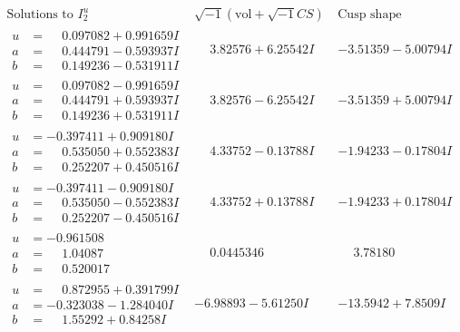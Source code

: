 \documentclass[1p]{elsarticle_modified}
\theoremstyle{definition}
\newcommand{\I}{\sqrt{-1}}
\begin{document}
$$\begin{array}{c|c|c}  
\text{Solutions to }I^u_{2}& \I (\text{vol} + \sqrt{-1}CS) & \text{Cusp shape}\\
 \hline 
\begin{aligned}
u &= \phantom{-}0.097082 + 0.991659 I \\
a &= \phantom{-}0.444791 - 0.593937 I \\
b &= \phantom{-}0.149236 - 0.531911 I\end{aligned}
 & \phantom{-}3.82576 + 6.25542 I & -3.51359 - 5.00794 I \\ \hline\begin{aligned}
u &= \phantom{-}0.097082 - 0.991659 I \\
a &= \phantom{-}0.444791 + 0.593937 I \\
b &= \phantom{-}0.149236 + 0.531911 I\end{aligned}
 & \phantom{-}3.82576 - 6.25542 I & -3.51359 + 5.00794 I \\ \hline\begin{aligned}
u &= -0.397411 + 0.909180 I \\
a &= \phantom{-}0.535050 + 0.552383 I \\
b &= \phantom{-}0.252207 + 0.450516 I\end{aligned}
 & \phantom{-}4.33752 - 0.13788 I & -1.94233 - 0.17804 I \\ \hline\begin{aligned}
u &= -0.397411 - 0.909180 I \\
a &= \phantom{-}0.535050 - 0.552383 I \\
b &= \phantom{-}0.252207 - 0.450516 I\end{aligned}
 & \phantom{-}4.33752 + 0.13788 I & -1.94233 + 0.17804 I \\ \hline\begin{aligned}
u &= -0.961508\phantom{ +0.000000I} \\
a &= \phantom{-}1.04087\phantom{ +0.000000I} \\
b &= \phantom{-}0.520017\phantom{ +0.000000I}\end{aligned}
 & \phantom{-}0.0445346\phantom{ +0.000000I} & \phantom{-}3.78180\phantom{ +0.000000I} \\ \hline\begin{aligned}
u &= \phantom{-}0.872955 + 0.391799 I \\
a &= -0.323038 - 1.284040 I \\
b &= \phantom{-}1.55292 + 0.84258 I\end{aligned}
 & -6.98893 - 5.61250 I & -13.5942 + 7.8509 I \\ \hline\begin{aligned}

\end{aligned}
\end{array}$$
\end{document}
